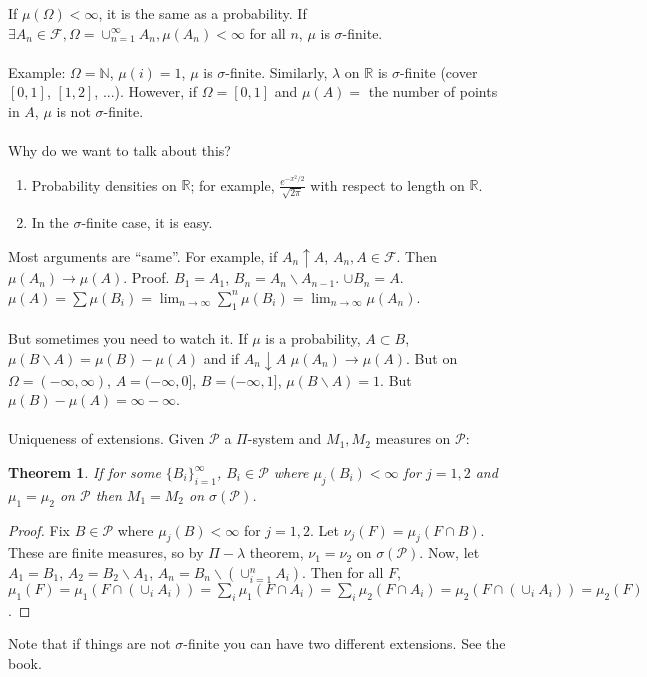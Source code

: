 \documentclass[12pt]{article}
\newtheorem{theorem}{Theorem}
\begin{document}
If $\mu(\Omega) < \infty$, it is the same as a probability.  If $\exists A_n \in \mathcal{F}, \Omega = \cup_{n=1}^\infty A_n, \mu(A_n) < \infty$ for all $n$, $\mu$ is $\sigma$-finite.
\\ \\
Example: $\Omega = \mathbb{N}$, $\mu(i) = 1$, $\mu$ is $\sigma$-finite.  Similarly, $\lambda$ on $\mathbb{R}$ is $\sigma$-finite (cover $[0,1]$, $[1,2]$, ...).  However, if $\Omega = [0,1]$ and $\mu(A) = $ the number of points in $A$, $\mu$ is not $\sigma$-finite.
\\ \\
Why do we want to talk about this?
\begin{enumerate}
\item Probability densities on $\mathbb{R}$; for example, $\frac{e^{-x^2/2}}{\sqrt{2 \pi}}$ with respect to length on $\mathbb{R}$.
\item In the $\sigma$-finite case, it is easy.
\end{enumerate}
Most arguments are ``same''.  For example, if $A_n \uparrow A$, $A_n, A \in \mathcal{F}$.  Then $\mu(A_n) \to \mu(A)$.  Proof.  $B_1 = A_1$, $B_n = A_n \backslash A_{n-1}$.  $\cup B_n = A$.  $\mu(A) = \sum \mu(B_i) = \lim_{n \to \infty} \sum_1^n \mu(B_i) = \lim_{n \to \infty} \mu(A_n)$.
\\ \\
But sometimes you need to watch it.  If $\mu$ is a probability, $A \subset B$, $\mu(B \backslash A) = \mu(B) - \mu(A)$ and if $A_n \downarrow A$ $\mu(A_n) \to \mu(A)$.  But on $\Omega = (-\infty, \infty)$, $A = (-\infty, 0]$, $B = (-\infty, 1]$, $\mu(B \backslash A) = 1$.  But $\mu(B) - \mu(A) = \infty - \infty$.
\\ \\
Uniqueness of extensions.  Given $\mathcal{P}$ a $\Pi$-system and $M_1, M_2$ measures on $\mathcal{P}$:
\begin{theorem}
If for some $\{B_i\}_{i=1}^\infty$, $B_i \in \mathcal{P}$ where $\mu_j(B_i) < \infty$ for $j = 1, 2$ and $\mu_1 = \mu_2$ on $\mathcal{P}$ then $M_1 = M_2$ on $\sigma(\mathcal{P})$.
\end{theorem}
\begin{proof}
Fix $B \in \mathcal{P}$ where $\mu_j(B) < \infty$ for $j=1,2$.  Let $\nu_j(F) = \mu_j(F \cap B)$.  These are finite measures, so by $\Pi-\lambda$ theorem, $\nu_1 = \nu_2$ on $\sigma(\mathcal{P})$.  Now, let $A_1 = B_1$, $A_2 = B_2 \backslash A_1$, $A_n = B_n \backslash (\cup_{i=1}^n A_i)$.  Then for all $F$, $\mu_1(F) = \mu_1(F \cap (\cup_i A_i)) = \sum_i \mu_1 (F \cap A_i) = \sum_i \mu_2 (F \cap A_i) = \mu_2(F \cap (\cup_i A_i)) = \mu_2(F)$.
\end{proof}
Note that if things are not $\sigma$-finite you can have two different extensions.  See the book.
\\ \\
\end{document}
